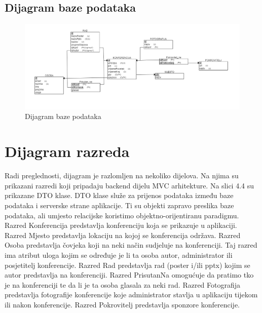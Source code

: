 			\subsection{Dijagram baze podataka}
					\begin{figure}[H]
						\includegraphics[scale=0.55]{dijagrami/dijagram baze podataka.PNG} %
						\centering
						\caption{Dijagram baze podataka}
						\label{fig:promjene3}
					\end{figure}			
			\eject
			
			
		\section{Dijagram razreda}
		
		
			Radi preglednosti, dijagram je razlomljen na nekoliko dijelova. Na njima su prikazani razredi koji pripadaju backend dijelu MVC arhitekture.
			Na slici 4.4 su prikazane DTO klase. DTO klase služe za prijenos podataka između baze podataka i serverske strane aplikacije. Ti su objekti zapravo preslika baze podataka, ali umjesto relacijske koristimo objektno-orijentiranu paradigmu. 
			Razred Konferencija predstavlja konferenciju koja se prikazuje u aplikaciji. 
Razred Mjesto predstavlja lokaciju na kojoj se konferencija održava.
Razred Osoba predstavlja čovjeka koji na neki način sudjeluje na konferenciji.  Taj razred ima atribut uloga kojim se određuje je li ta osoba autor, administrator ili posjetitelj konferencije. 
Razred Rad predstavlja rad (poster i/ili pptx) kojim se autor predstavlja na konferenciji.
Razred PrisutanNa omogućuje da pratimo tko je na konferenciji te da li je ta osoba glasala za neki rad.
Razred Fotografija predstavlja fotografije konferencije koje administrator stavlja u aplikaciju tijekom ili nakon konferencije.
Razred Pokrovitelj predstavlja sponzore konferencije. 

